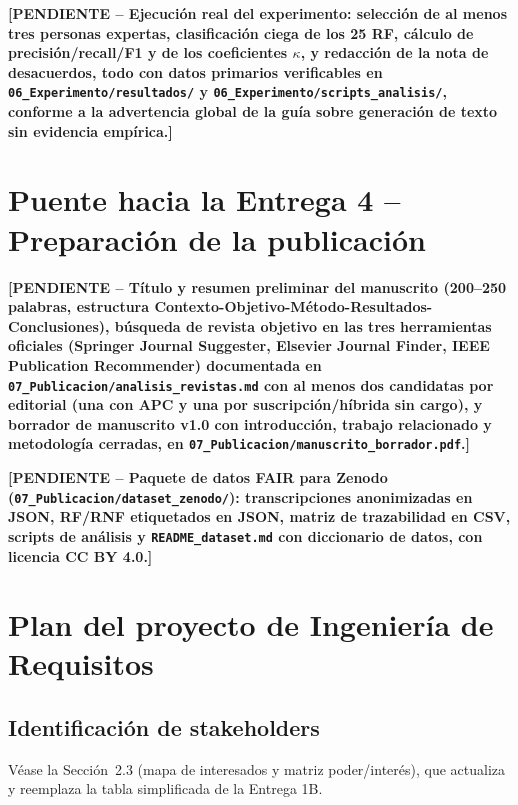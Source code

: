 \documentclass[11pt,a4paper]{article}
\newcommand{\PENDIENTE}[1]{\textcolor{pendiente}{\textbf{[PENDIENTE -- #1]}}}
\begin{document}
\PENDIENTE{Ejecución real del experimento: selección de al menos tres personas expertas, clasificación ciega de los 25 RF, cálculo de precisión/recall/F1 y de los coeficientes $\kappa$, y redacción de la nota de desacuerdos, todo con datos primarios verificables en \texttt{06\_Experimento/resultados/} y \texttt{06\_Experimento/scripts\_analisis/}, conforme a la advertencia global de la guía sobre generación de texto sin evidencia empírica.}

\section{Puente hacia la Entrega 4 -- Preparación de la publicación}
\PENDIENTE{Título y resumen preliminar del manuscrito (200--250 palabras, estructura Contexto-Objetivo-Método-Resultados-Conclusiones), búsqueda de revista objetivo en las tres herramientas oficiales (Springer Journal Suggester, Elsevier Journal Finder, IEEE Publication Recommender) documentada en \texttt{07\_Publicacion/analisis\_revistas.md} con al menos dos candidatas por editorial (una con APC y una por suscripción/híbrida sin cargo), y borrador de manuscrito v1.0 con introducción, trabajo relacionado y metodología cerradas, en \texttt{07\_Publicacion/manuscrito\_borrador.pdf}.}

\PENDIENTE{Paquete de datos FAIR para Zenodo (\texttt{07\_Publicacion/dataset\_zenodo/}): transcripciones anonimizadas en JSON, RF/RNF etiquetados en JSON, matriz de trazabilidad en CSV, scripts de análisis y \texttt{README\_dataset.md} con diccionario de datos, con licencia CC BY 4.0.}

\appendix
\section{Plan del proyecto de Ingeniería de Requisitos}
\subsection{Identificación de stakeholders}
Véase la Sección~2.3 (mapa de interesados y matriz poder/interés), que actualiza y reemplaza la tabla simplificada de la Entrega 1B.
\end{document}
